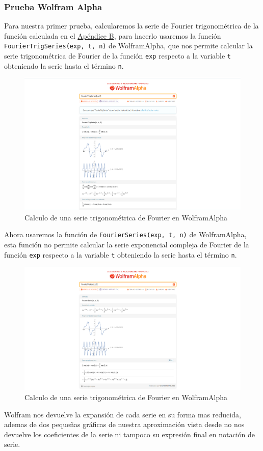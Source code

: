 \subsubsection{Prueba Wolfram Alpha}
Para nuestra primer prueba, calcularemos la serie de Fourier trigonométrica de la función calculada en el  \hyperref[app2:trig-coeff]{Apéndice B}, para hacerlo usaremos la función \texttt{FourierTrigSeries(exp, t, n)} de WolframAlpha, que nos permite calcular la serie trigonométrica de Fourier de la función \texttt{exp} respecto a la variable \texttt{t} obteniendo la serie hasta el término \texttt{n}.
\begin{figure}[H]
	\centering
	\includegraphics[width=1\textwidth]{img/chapter02/wolfram_trig_series.png}
	\caption{Calculo de una serie trigonométrica de Fourier en WolframAlpha}
	\label{fig:wolfram-trig-series}  %
\end{figure}
Ahora usaremos la función de \texttt{FourierSeries(exp, t, n)} de WolframAlpha, esta función no permite calcular la serie exponencial compleja de Fourier de la función \texttt{exp} respecto a la variable \texttt{t} obteniendo la serie hasta el término \texttt{n}.
\begin{figure}[H]
	\centering
	\includegraphics[width=1\textwidth]{img/chapter02/wolfram_complex_series.png}
	\caption{Calculo de una serie trigonométrica de Fourier en WolframAlpha}
	\label{fig:wolfram-exp-series}  %
\end{figure}
Wolfram nos devuelve la expansión de cada serie en su forma mas reducida, ademas de dos pequeñas gráficas de nuestra aproximación vista desde  no nos devuelve los coeficientes de la serie ni tampoco su expresión final en notación de serie.

